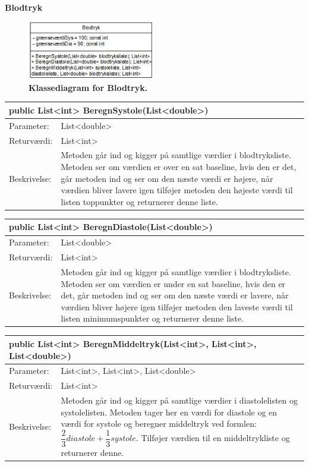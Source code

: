 \textbf{Blodtryk}
\begin{figure}[H]
\includegraphics[width =0.5\textwidth , center]{billeder/klassediagramblodtryk}
\caption{\textbf{Klassediagram for Blodtryk.}}
\end{figure}
\begin{table}[H]
\label{tab:tabel2}
\begin{tabular}{| l | p{13cm} |}
   \hline
   \multicolumn{2}{|l|}{public List<int> BeregnSystole(List<double>)} \\ \hline
   Parameter: & List<double>\\ \hline
   Returværdi: & List<int> \\ \hline
   Beskrivelse: & Metoden går ind og kigger på samtlige værdier i blodtryksliste. Metoden ser om værdien er over en sat baseline, hvis den er det, går metoden ind og ser om den næste værdi er højere, når værdien bliver lavere igen tilføjer metoden den højeste værdi til listen toppunkter og returnerer denne liste. \\ \hline
\end{tabular}
\end{table}
\begin{table}[H]
\label{tab:tabel2}
\begin{tabular}{| l | p{13cm} |}
   \hline
   \multicolumn{2}{|l|}{public List<int> BeregnDiastole(List<double>)} \\ \hline
   Parameter: & List<double>\\ \hline
   Returværdi: & List<int> \\ \hline
   Beskrivelse: & Metoden går ind og kigger på samtlige værdier i blodtryksliste. Metoden ser om værdien er under en sat baseline, hvis den er det, går metoden ind og ser om den næste værdi er lavere, når værdien bliver højere igen tilføjer metoden den laveste værdi til listen minimumspunkter og returnerer denne liste. \\ \hline
\end{tabular}
\end{table}
\begin{table}[H]
\label{tab:tabel2}
\begin{tabular}{| l | p{13cm} |}
   \hline
   \multicolumn{2}{|l|}{public List<int> BeregnMiddeltryk(List<int>, List<int>, List<double>)} \\ \hline
   Parameter: & List<int>, List<int>, List<double>\\ \hline
   Returværdi: & List<int> \\ \hline
   Beskrivelse: & Metoden går ind og kigger på samtlige værdier i diastolelisten og systolelisten. Metoden tager  her en værdi for diastole og en værdi for systole og beregner middeltryk ved formlen: $\dfrac{2}{3}diastole+\dfrac{1}{3}systole$. Tilføjer værdien til en middeltrykliste og returnerer denne. \\ \hline
\end{tabular}
\end{table}

